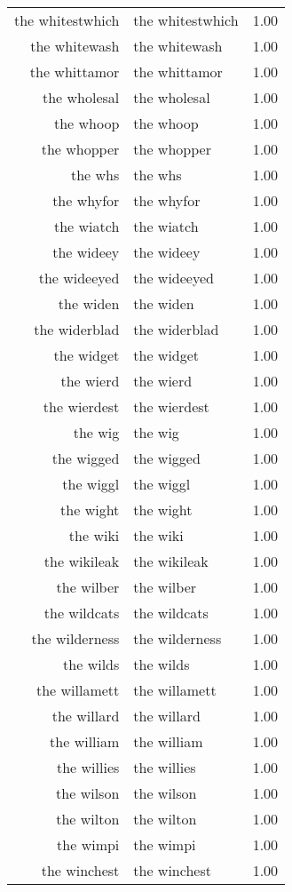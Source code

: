 \begin{table}[ht]
\begin{tabular}{rlr}
  the whitestwhich & the whitestwhich & 1.00 \\ 
  the whitewash & the whitewash & 1.00 \\ 
  the whittamor & the whittamor & 1.00 \\ 
  the wholesal & the wholesal & 1.00 \\ 
  the whoop & the whoop & 1.00 \\ 
  the whopper & the whopper & 1.00 \\ 
  the whs & the whs & 1.00 \\ 
  the whyfor & the whyfor & 1.00 \\ 
  the wiatch & the wiatch & 1.00 \\ 
  the wideey & the wideey & 1.00 \\ 
  the wideeyed & the wideeyed & 1.00 \\ 
  the widen & the widen & 1.00 \\ 
  the widerblad & the widerblad & 1.00 \\ 
  the widget & the widget & 1.00 \\ 
  the wierd & the wierd & 1.00 \\ 
  the wierdest & the wierdest & 1.00 \\ 
  the wig & the wig & 1.00 \\ 
  the wigged & the wigged & 1.00 \\ 
  the wiggl & the wiggl & 1.00 \\ 
  the wight & the wight & 1.00 \\ 
  the wiki & the wiki & 1.00 \\ 
  the wikileak & the wikileak & 1.00 \\ 
  the wilber & the wilber & 1.00 \\ 
  the wildcats & the wildcats & 1.00 \\ 
  the wilderness & the wilderness & 1.00 \\ 
  the wilds & the wilds & 1.00 \\ 
  the willamett & the willamett & 1.00 \\ 
  the willard & the willard & 1.00 \\ 
  the william & the william & 1.00 \\ 
  the willies & the willies & 1.00 \\ 
  the wilson & the wilson & 1.00 \\ 
  the wilton & the wilton & 1.00 \\ 
  the wimpi & the wimpi & 1.00 \\ 
  the winchest & the winchest & 1.00 \\ 

\end{tabular}
\end{table}
